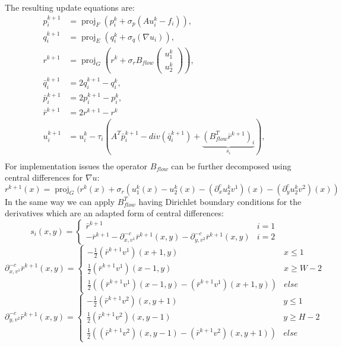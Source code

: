 \documentclass[A4,12pt]{article}
\DeclareMathOperator*{\proj}{proj}
\begin{document}
The resulting update equations are:
\begin{equation}
\begin{aligned}
p_i^{k+1}&=\proj_F(p_i^k + \sigma_p (Au_i^k - f_i)), \\
q_i^{k+1}&=\proj_E(q_i^k + \sigma_q (\nabla u_i)), \\
r^{k+1}&=\proj_G\left(r^{k} + \sigma_r B_{flow}\begin{pmatrix}u_1^k \\ u_2^k\end{pmatrix}\right), \\
\bar q_i^{k+1} &= 2q_i^{k+1} - q_i^k,\\
\bar p_i^{k+1} &= 2p_i^{k+1} - p_i^k,\\
\bar r^{k+1} &= 2r^{k+1} - r^k\\
u_i^{k+1}&=u_i^k-\tau_i(A^T\bar p_i^{k+1}-div(\bar q_i^{k+1})+\underbrace{(B_{flow}^T\bar r^{k+1})_i}_{s_i}), \\
\end{aligned}
\end{equation}
For implementation issues the operator $B_{flow}$ can be further decomposed using central differences for $\nabla u$:
\begin{equation}
r^{k+1}(x) = \proj_G(r^{k}(x) + \sigma_r(u_1^k(x)-u_2^k(x)-(\partial^c_x u_2^kv^1)(x)-(\partial^c_y u_2^kv^2)(x))
\end{equation}
In the same way we can apply $B_{flow}^T$ having Dirichlet boundary conditions for the derivatives which are an adapted form of central differences:
\begin{equation}
s_i(x, y) =
\begin{cases}
\bar r^{k+1} & i=1 \\
-\bar r^{k+1} - \partial^{-c}_{x, v^1}\bar r^{k+1} (x, y) - \partial^{-c}_{y, v^2} \bar r^{k+1} (x, y) & i=2
\end{cases}
\end{equation}
\begin{equation}
\partial^{-c}_{x, v^1} \bar r^{k+1} (x, y) =
\begin{cases}
-\frac{1}{2} (\bar r^{k+1} v^1)(x+1, y) & x \leq 1 \\
\frac{1}{2} (\bar r^{k+1} v^1)(x-1, y) & x \geq W - 2 \\
\frac{1}{2} \left((\bar r^{k+1} v^1)(x-1, y) - (\bar r^{k+1} v^1)(x+1, y)\right) & else
\end{cases}
\end{equation}
\begin{equation}
\partial^{-c}_{y, v^2} \bar r^{k+1} (x, y) =
\begin{cases}
-\frac{1}{2} (\bar r^{k+1} v^2)(x, y+1) & y \leq 1 \\
\frac{1}{2} (\bar r^{k+1} v^2)(x, y-1) & y \geq H - 2 \\
\frac{1}{2} \left((\bar r^{k+1} v^2)(x, y-1) - (\bar r^{k+1} v^2)(x, y+1)\right) & else
\end{cases}
\end{equation}\\\\
\end{document}
